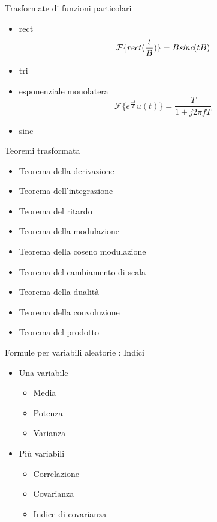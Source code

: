 \documentclass{article}
\begin{document}
Trasformate di funzioni particolari
\begin{itemize}
\item rect \begin{equation*}
  \mathcal{F}\{rect(\frac{t}{B})\} = B \emph{sinc}(tB)
\end{equation*}
\item tri
\item esponenziale monolatera \begin{equation*}
  \mathcal{F}\{e^{\frac{-t}{T}}u(t)\} = \frac{T}{1 + j2\pi fT}
\end{equation*}
\item sinc
\end{itemize}

Teoremi trasformata
\begin{itemize}
\item Teorema della derivazione
\item Teorema dell'integrazione
\item Teorema del ritardo
\item Teorema della modulazione %
\item Teorema della coseno modulazione %
\item Teorema del cambiamento di scala %
\item Teorema della dualità %
\item Teorema della convoluzione
\item Teorema del prodotto
\end{itemize}

Formule per variabili aleatorie : Indici
\begin{itemize}
\item Una variabile \begin{itemize}
\item Media
\item Potenza
\item Varianza
\end{itemize}
\item Più variabili \begin{itemize}
  \item Correlazione
  \item Covarianza
  \item Indice di covarianza
\end{itemize}
\end{itemize}
\end{document}
